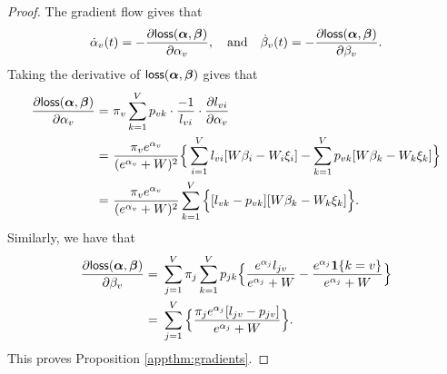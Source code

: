 \begin{proof}
The gradient flow gives that
\[
\dot{\alpha}_v(t) = - \frac{\partial \mathsf{loss}(\bm{\alpha},\boldsymbol{\beta})}{\partial \alpha_v}, \quad \text{and}\quad \dot{\beta}_v(t)=-\frac{\partial\mathsf{loss}(\bm{\alpha}, \boldsymbol{\beta})}{\partial \beta_v}.
\]
Taking the derivative of $\mathsf{loss}(\bm{\alpha},\boldsymbol{\beta})$ gives that
\begin{align*}
\frac{\partial \mathsf{loss}(\bm{\alpha},\boldsymbol{\beta})}{\partial \alpha_v}
= ~& \pi_v \sum_{k=1}^V p_{vk} \cdot \frac{-1}{l_{vi}}\cdot \frac{\partial l_{vi}}{\partial \alpha_v}\\
= ~& \frac{\pi_v e^{\alpha_v}}{(e^{\alpha_v}+W)^2} \Big\{  \sum_{i=1}^V l_{vi} [W\beta_i - W_i \xi_i] - \sum_{k=1}^V p_{vk} [W\beta_k-W_k\xi_k]\Big\}\\
= ~& \frac{\pi_v e^{\alpha_v}}{(e^{\alpha_v}+W)^2} \sum_{k=1}^V \Big\{  [l_{vk}-p_{vk}] [W\beta_k-W_k\xi_k]\Big\}.
\end{align*}
Similarly, we have that
\begin{align*}
\frac{\partial \mathsf{loss}(\bm{\alpha},\boldsymbol{\beta})}{\partial \beta_v} 
= ~& \sum_{j=1}^V \pi_j \sum_{k=1}^V p_{jk} \Big\{ \frac{e^{\alpha_j} l_{jv}}{e^{\alpha_j}+W} - \frac{e^{\alpha_j} \bm{1}\{k=v\}}{e^{\alpha_j}+W} \Big\}\\
= ~& \sum_{j=1}^V \Big\{\frac{\pi_{j}e^{\alpha_j}[l_{jv}-p_{jv}]}{e^{\alpha_j}+W}\Big\}.
\end{align*}
This proves Proposition \ref{appthm:gradients}.
\end{proof}
